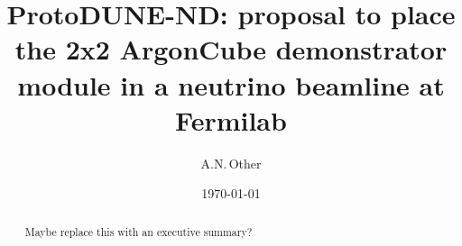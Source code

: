 \documentclass[aps,prd,preprint,superscriptaddress,nofootinbib]{revtex4-1}
\begin{document}
\title{ProtoDUNE-ND: proposal to place the 2x2 ArgonCube demonstrator module in a neutrino beamline at Fermilab}

\author{A.N.\,Other}

\date{\today}

\begin{abstract}
Maybe replace this with an executive summary?
\end{abstract}

\maketitle










%
\end{document}
